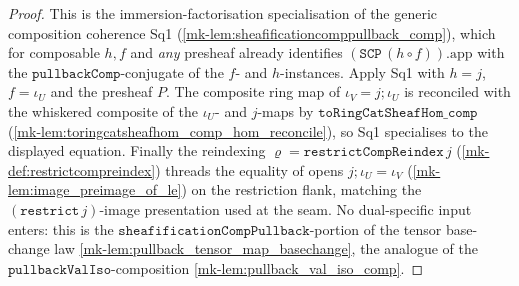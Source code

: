 \begin{proof}
  \leanok
  This is the immersion-factorisation specialisation of the generic composition coherence Sq1
  (\ref{mk-lem:sheafificationcomppullback_comp}), which for composable \(h, f\) and \emph{any} presheaf
  already identifies \((\mathtt{SCP}\,(h\circ f)).\mathrm{app}\) with the
  \(\mathtt{pullbackComp}\)-conjugate of the \(f\)- and \(h\)-instances. Apply Sq1 with \(h = j\),
  \(f = \iota_U\) and the presheaf \(P\). The composite ring map of \(\iota_V = j \mathbin{;} \iota_U\)
  is reconciled with the whiskered composite of the \(\iota_U\)- and \(j\)-maps by
  \(\mathtt{toRingCatSheafHom\_comp}\) (\ref{mk-lem:toringcatsheafhom_comp_hom_reconcile}), so Sq1
  specialises to the displayed equation. Finally the reindexing
  \(\varrho = \mathtt{restrictCompReindex}\,j\) (\ref{mk-def:restrictcompreindex}) threads the equality of
  opens \(j \mathbin{;} \iota_U = \iota_V\) (\ref{mk-lem:image_preimage_of_le}) on the restriction flank,
  matching the \((\mathtt{restrict}\,j)\)-image presentation used at the seam. No dual-specific input
  enters: this is the \(\mathtt{sheafificationCompPullback}\)-portion of the tensor base-change law
  \ref{mk-lem:pullback_tensor_map_basechange}, the analogue of the
  \(\mathtt{pullbackValIso}\)-composition \ref{mk-lem:pullback_val_iso_comp}.
\end{proof}

